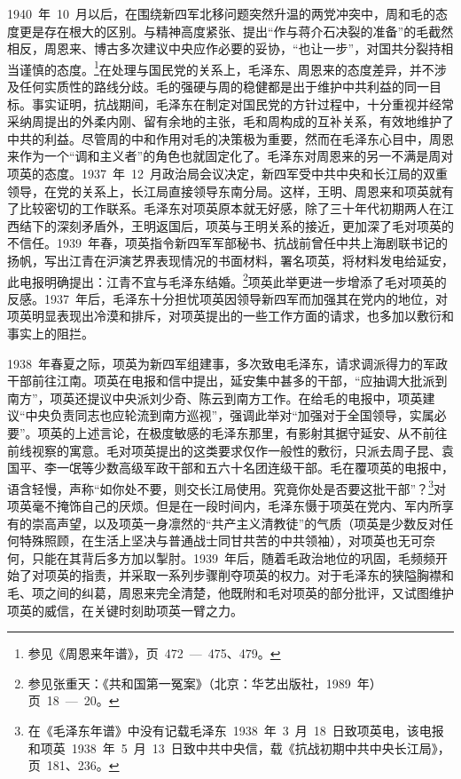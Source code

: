 1940~年~10~月以后，在围绕新四军北移问题突然升温的两党冲突中，周和毛的态度更是存在根大的区别。与精神高度紧张、提出“作与蒋介石决裂的准备”的毛截然相反，周恩来、博古多次建议中央应作必要的妥协，“也让一步”，对国共分裂持相当谨慎的态度。\footnote{参见《周恩来年谱》，页~472~—~475、479。}在处理与国民党的关系上，毛泽东、周恩来的态度差异，并不涉及任何实质性的路线分歧。毛的强硬与周的稳健都是出于维护中共利益的同一目标。事实证明，抗战期间，毛泽东在制定对国民党的方针过程中，十分重视并经常采纳周提出的外柔内刚、留有余地的主张，毛和周构成的互补关系，有效地维护了中共的利益。尽管周的中和作用对毛的决策极为重要，然而在毛泽东心目中，周恩来作为一个“调和主义者”的角色也就固定化了。毛泽东对周恩来的另一不满是周对项英的态度。1937~年~12~月政治局会议决定，新四军受中共中央和长江局的双重领导，在党的关系上，长江局直接领导东南分局。这样，王明、周恩来和项英就有了比较密切的工作联系。毛泽东对项英原本就无好感，除了三十年代初期两人在江西结下的深刻矛盾外，王明返国后，项英与王明关系的接近，更加深了毛对项英的不信任。1939~年春，项英指令新四军军部秘书、抗战前曾任中共上海剧联书记的扬帆，写出江青在沪演艺界表现情况的书面材料，署名项英，将材料发电给延安，此电报明确提出：江青不宜与毛泽东结婚。\footnote{参见张重天：《共和国第一冤案》（北京：华艺出版社，1989~年）页~18~—~20。}项英此举更进一步增添了毛对项英的反感。1937~年后，毛泽东十分担忧项英因领导新四军而加强其在党内的地位，对项英明显表现出冷漠和排斥，对项英提出的一些工作方面的请求，也多加以敷衍和事实上的阻拦。

1938~年春夏之际，项英为新四军组建事，多次致电毛泽东，请求调派得力的军政干部前往江南。项英在电报和信中提出，延安集中甚多的干部，“应抽调大批派到南方”，项英还提议中央派刘少奇、陈云到南方工作。在给毛的电报中，项英建议“中央负责同志也应轮流到南方巡视”，强调此举对“加强对于全国领导，实属必要”。项英的上述言论，在极度敏感的毛泽东那里，有影射其据守延安、从不前往前线视察的寓意。毛对项英提出的这类要求仅作一般性的敷衍，只派去周子昆、袁国平、李一氓等少数高级军政干部和五六十名团连级干部。毛在覆项英的电报中，语含轻慢，声称“如你处不要，则交长江局使用。究竟你处是否要这批干部”？\footnote{在《毛泽东年谱》中没有记载毛泽东~1938~年~3~月~18~日致项英电，该电报和项英~1938~年~5~月~13~日致中共中央信，载《抗战初期中共中央长江局》，页~181、236。}对项英毫不掩饰自己的厌烦。但是在一段时间内，毛泽东慑于项英在党内、军内所享有的崇高声望，以及项英一身凛然的“共产主义清教徒”的气质（项英是少数反对任何特殊照顾，在生活上坚决与普通战士同甘共苦的中共领袖），对项英也无可奈何，只能在其背后多方加以掣肘。1939~年后，随着毛政治地位的巩固，毛频频开始了对项英的指责，并采取一系列步骤削夺项英的权力。对于毛泽东的狭隘胸襟和毛、项之间的纠葛，周恩来完全清楚，他既附和毛对项英的部分批评，又试图维护项英的威信，在关键时刻助项英一臂之力。

